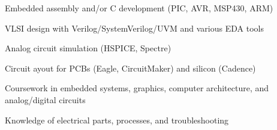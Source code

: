 \begin{plainlist}
	\item Embedded assembly and/or C development (PIC, AVR, MSP430, ARM)
	\item VLSI design with Verilog/SystemVerilog/UVM and various EDA tools
	\item Analog circuit simulation (HSPICE, Spectre)
	\item Circuit ayout for PCBs (Eagle, CircuitMaker) and silicon (Cadence)
	\item Coursework in embedded systems, graphics, computer architecture, and analog/digital circuits
	\item Knowledge of electrical parts, processes, and troubleshooting
\end{plainlist}
